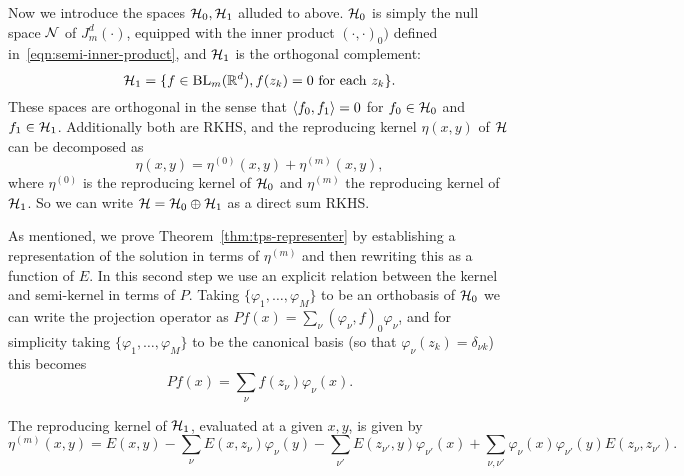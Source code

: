 \documentclass{article}
\begin{document}
Now we introduce the spaces $\mathcal{H}_0, \mathcal{H}_1$ alluded to above. $\mathcal{H}_0$ is simply the null space $\mathcal{N}$ of $J_m^d(\cdot)$, equipped with the inner product $(\cdot,\cdot)_0)$ defined in~\eqref{eqn:semi-inner-product}, and $\mathcal{H}_1$ is the orthogonal complement:
$$\mathcal{H}_1 = \{f \in \mathrm{BL}_m(\mathbb{R}^d), f(z_k) = 0~\textrm{for each}~z_k\}.$$
These spaces are orthogonal in the sense that $\langle f_0, f_1 \rangle = 0$ for $f_0 \in \mathcal{H}_0$ and $f_1 \in \mathcal{H}_1$. Additionally both are RKHS, and the reproducing kernel $\eta(x,y)$ of $\mathcal{H}$ can be decomposed as
\begin{equation*}
\eta(x,y) = \eta^{(0)}(x,y) + \eta^{(m)}(x,y),
\end{equation*}
where $\eta^{(0)}$ is the reproducing kernel of $\mathcal{H}_0$ and $\eta^{(m)}$ the reproducing kernel of $\mathcal{H}_1$. So we can write $\mathcal{H} = \mathcal{H}_0 \oplus \mathcal{H}_1$ as a direct sum RKHS.

As mentioned, we prove Theorem~\ref{thm:tps-representer} by establishing a representation of the solution in terms of $\eta^{(m)}$ and then rewriting this as a function of $E$. In this second step we use an explicit relation between the kernel and semi-kernel in terms of $P$. Taking $\{\varphi_1,\ldots,\varphi_M\}$ to be an orthobasis of $\mathcal{H}_0$ we can write the projection operator as $Pf(x) = \sum_{\nu} (\varphi_{\nu},f)_0 \varphi_{\nu}$, and for simplicity taking $\{\varphi_1,\ldots,\varphi_M\}$ to be the canonical basis (so that $\varphi_{\nu}(z_k) = \delta_{\nu k}$) this becomes
\begin{equation*}
	Pf(x) = \sum_{\nu} f(z_{\nu}) \varphi_{\nu}(x).
\end{equation*}

\begin{theorem}
	\label{lem:rk-greens}
The reproducing kernel of $\mathcal{H}_1$, evaluated at a given $x,y$, is given by
\begin{equation}
	\label{eqn:rk}
	\eta^{(m)}(x,y) = E(x,y) - \sum_{\nu} E(x,z_{\nu}) \varphi_{\nu}(y) - \sum_{\nu'} E(z_{\nu'},y) \varphi_{\nu'}(x) + \sum_{\nu,\nu'} \varphi_{\nu}(x) \varphi_{\nu'}(y) E(z_{\nu},z_{\nu'}).
\end{equation}
\end{theorem}
\end{document}
